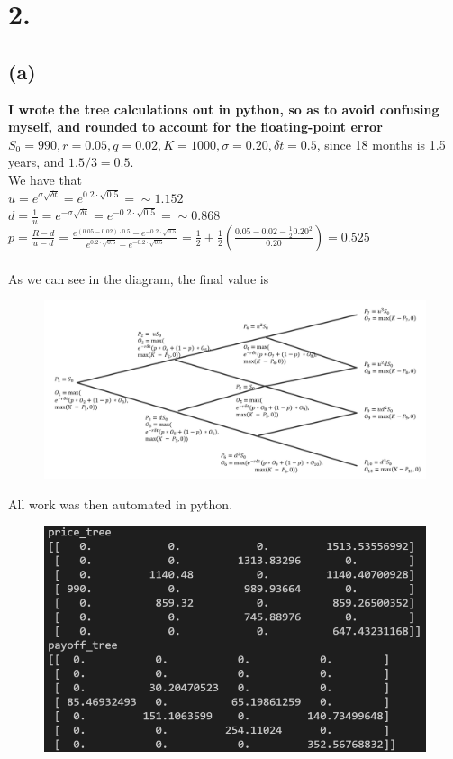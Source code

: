 \documentclass{article}
\begin{document}
\section*{2.}
{\Large

\subsection*{(a)}
\textbf{I wrote the tree calculations out in python, so as to avoid confusing myself, and rounded to account for the floating-point error} \\

$S_0 = 990, r = 0.05, q = 0.02, K = 1000, \sigma = 0.20, \delta t = 0.5$, since 18 months is 1.5 years, and $1.5 / 3 = 0.5$. \\
We have that \\
$u = e^{\sigma\sqrt{\delta t}} = e^{0.2 \cdot \sqrt{0.5}} = \sim 1.152$ \\
$d = \frac{1}{u} = e^{-\sigma\sqrt{\delta t}} = e^{-0.2 \cdot \sqrt{0.5}} = \sim 0.868$ \\
$p = \frac{R - d}{u - d} = \frac{e^{(0.05 - 0.02) \cdot 0.5} - e^{-0.2 \cdot \sqrt{0.5}}}{e^{0.2 \cdot \sqrt{0.5}} - e^{-0.2 \cdot \sqrt{0.5}}} = \frac{1}{2} + \frac{1}{2}(\frac{0.05 - 0.02 - \frac{1}{2}0.20^2}{0.20}) = 0.525$ \\ \\
As we can see in the diagram, the final value is 

\begin{figure}[h]
  \centering
  \includegraphics[width=120mm]{./2a_tree.png}
\end{figure}

All work was then automated in python.

\begin{figure}[h]
  \centering
  \includegraphics[width=120mm]{./2a.png}
\end{figure}

}
\end{document}
